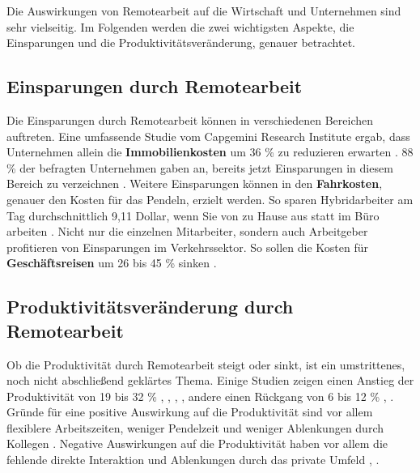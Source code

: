 \documentclass[runningheads]{llncs}
\begin{document}
Die Auswirkungen von Remotearbeit auf die Wirtschaft und Unternehmen sind sehr vielseitig.
Im Folgenden werden die zwei wichtigsten Aspekte, die Einsparungen und die Produktivitätsveränderung, genauer betrachtet.

\subsection{Einsparungen durch Remotearbeit}

Die Einsparungen durch Remotearbeit können in verschiedenen Bereichen auftreten.
Eine umfassende Studie vom Capgemini Research Institute ergab, dass Unternehmen allein die \textbf{Immobilienkosten} um 36 \% zu reduzieren erwarten \cite{capgemini_research_institute_future_2020}.
88 \% der befragten Unternehmen gaben an, bereits jetzt Einsparungen in diesem Bereich zu verzeichnen \cite{capgemini_research_institute_future_2020}.
Weitere Einsparungen können in den \textbf{Fahrkosten}, genauer den Kosten für das Pendeln, erzielt werden.
So sparen Hybridarbeiter am Tag durchschnittlich 9,11 Dollar, wenn Sie von zu Hause aus statt im Büro arbeiten \cite{owl_labs_state_2022}.
Nicht nur die einzelnen Mitarbeiter, sondern auch Arbeitgeber profitieren von Einsparungen im Verkehrssektor.
So sollen die Kosten für \textbf{Geschäftsreisen} um 26 bis 45 \% sinken \cite{capgemini_research_institute_future_2020}.

\subsection{Produktivitätsveränderung durch Remotearbeit}

Ob die Produktivität durch Remotearbeit steigt oder sinkt, ist ein umstrittenes, noch nicht abschließend geklärtes Thema.
Einige Studien zeigen einen Anstieg der Produktivität von 19 bis 32 \% \cite{capgemini_research_institute_future_2020}, \cite{glenn_dutcher_effects_2012}, \cite{owl_labs_state_2022}, \cite{global_workplace_analytics_latest_2021}, andere einen Rückgang von 6 bis 12 \% \cite{emanuel_working_2023}, \cite{steven_j_davis_evolution_2023}.
Gründe für eine positive Auswirkung auf die Produktivität sind vor allem flexiblere Arbeitszeiten, weniger Pendelzeit und weniger Ablenkungen durch Kollegen \cite{capgemini_research_institute_future_2020}.
Negative Auswirkungen auf die Produktivität haben vor allem die fehlende direkte Interaktion und Ablenkungen durch das private Umfeld \cite{holand_homeoffice_2023}, \cite{emanuel_working_2023}.
\end{document}

